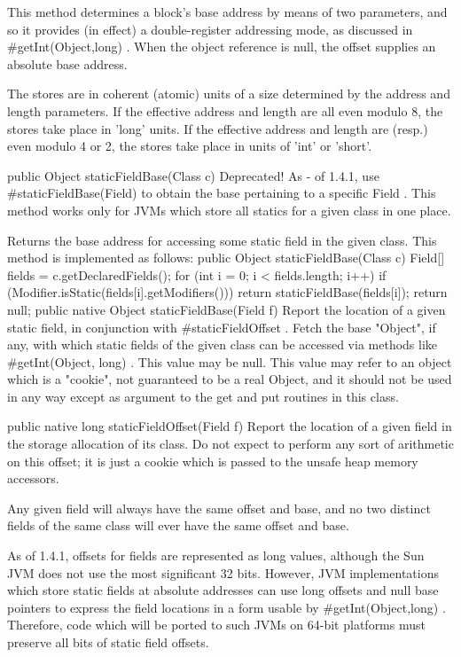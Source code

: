 This method determines a block's base address by means of two parameters,
and so it provides (in effect) a double-register addressing mode,
as discussed in #getInt(Object,long) .  When the object reference is null,
the offset supplies an absolute base address.


The stores are in coherent (atomic) units of a size determined
by the address and length parameters.  If the effective address and
length are all even modulo 8, the stores take place in 'long' units.
If the effective address and length are (resp.) even modulo 4 or 2,
the stores take place in units of 'int' or 'short'.

 public Object staticFieldBase(Class c) 
Deprecated! As - of 1.4.1, use #staticFieldBase(Field) to obtain the base pertaining to a specific Field . This method works only for JVMs which store all statics for a given class in one place.

Returns the base address for accessing some static field in the given class. This method is implemented as follows:
public Object staticFieldBase(Class c) {
    Field[] fields = c.getDeclaredFields();
    for (int i = 0; i < fields.length; i++) {
        if (Modifier.isStatic(fields[i].getModifiers())) {
            return staticFieldBase(fields[i]);
        }
    }
    return null;
}
 public native Object staticFieldBase(Field f)
Report the location of a given static field, in conjunction with #staticFieldOffset .
Fetch the base "Object", if any, with which static fields of the
given class can be accessed via methods like #getInt(Object,
long) .  This value may be null.  This value may refer to an object
which is a "cookie", not guaranteed to be a real Object, and it should
not be used in any way except as argument to the get and put routines in
this class.

 public native long staticFieldOffset(Field f)
Report the location of a given field in the storage allocation of its
class.  Do not expect to perform any sort of arithmetic on this offset;
it is just a cookie which is passed to the unsafe heap memory accessors.

Any given field will always have the same offset and base, and no
two distinct fields of the same class will ever have the same offset
and base.


As of 1.4.1, offsets for fields are represented as long values,
although the Sun JVM does not use the most significant 32 bits.
However, JVM implementations which store static fields at absolute
addresses can use long offsets and null base pointers to express
the field locations in a form usable by #getInt(Object,long) .
Therefore, code which will be ported to such JVMs on 64-bit platforms
must preserve all bits of static field offsets.

